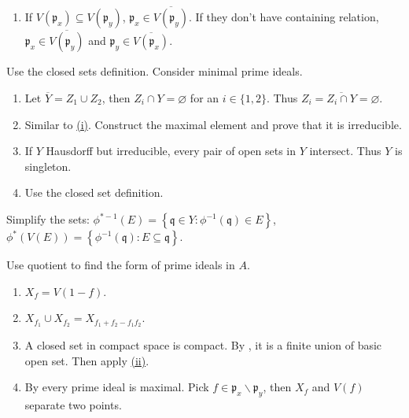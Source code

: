 \begin{exercise}\label{ex1.18}
	\begin{enumerate}
		\item[(iv)] If $V\left(\mathfrak{p}_x\right)\subseteq V\left(\mathfrak{p}_y\right)$, $\mathfrak{p}_x\in\overline{V\left(\mathfrak{p}_y\right)}$. If they don't have containing relation, $\mathfrak{p}_x\in\overline{V\left(\mathfrak{p}_y\right)}$ and $\mathfrak{p}_y\in\overline{V\left(\mathfrak{p}_x\right)}$.
	\end{enumerate}
\end{exercise}

\begin{exercise}\label{ex1.19}
	Use the closed sets definition. Consider minimal prime ideals.
\end{exercise}

\begin{exercise}\label{ex1.20}
	\begin{enumerate}[label=(\roman*),ref=\theexercise(\roman*)]
		\item\label{ex1.20.1} Let $\overline{Y}=Z_1\cup Z_2$, then $Z_i\cap Y=\varnothing$ for an $i\in\{1,2\}$. Thus $Z_i=\overline{Z_i\cap Y}=\varnothing$.
		\item Similar to \hyperref[ex1.20.1]{(i)}. Construct the maximal element and prove that it is irreducible.
		\item If $Y$ Hausdorff but irreducible, every pair of open sets in $Y$ intersect. Thus $Y$ is singleton.
		\item\label{ex1.20.4} Use the closed set definition.
	\end{enumerate}
\end{exercise}

\begin{exercise}\label{ex1.21}
	Simplify the sets: $\phi^{*-1}(E)=\left\{\mathfrak{q}\in Y:\phi^{-1}(\mathfrak{q})\in E\right\}$, $\phi^{*}(V(E))=\left\{\phi^{-1}(\mathfrak{q}):E\subseteq\mathfrak{q}\right\}$.
\end{exercise}

\begin{exercise}\label{ex1.22}
	Use quotient to find the form of prime ideals in $A$.
\end{exercise}

\begin{exercise}\label{ex1.23}
	\begin{enumerate}[label=(\roman*),ref=\theexercise(\roman*)]
		\item $X_f=V(1-f)$.
		\item\label{ex1.23.2} $X_{f_1}\cup X_{f_2}=X_{f_1+f_2-f_1f_2}$.
		\item A closed set in compact space is compact. By , it is a finite union of basic open set. Then apply \hyperref[ex1.23.2]{(ii)}.
		\item\label{ex1.23.4} By  every prime ideal is maximal. Pick $f\in\mathfrak{p}_x\backslash\mathfrak{p}_y$, then $X_f$ and $V(f)$ separate two points.
	\end{enumerate}
\end{exercise}

